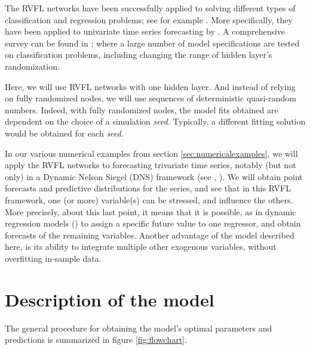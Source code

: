 \medskip

The RVFL networks have been successfully applied to solving different types of classification and regression problems; see for example \cite{dehuri2010comprehensive}. More specifically, they have been applied to univariate time series forecasting by \cite{ren2016random}. A comprehensive survey can be found in \cite{zhang2016comprehensive}; where a large number of model specifications are tested on classification problems, including changing the range of hidden layer's randomization.

\medskip

Here, we will use RVFL networks with one hidden layer. And instead of relying on fully randomized nodes, we will use sequences of deterministic quasi-random numbers. Indeed, with fully randomized nodes, the model fits obtained are dependent on the choice of a simulation \textit{seed}. Typically, a different fitting solution would be obtained for each \textit{seed}.

\medskip

In our various numerical examples from section \ref{sec:numericalexamples}, we will apply the RVFL networks to forecasting trivariate time series, notably (but not only) in a Dynamic Nelson Siegel (DNS) framework (see \cite{nelson1987parsimonious}, \cite{diebold2006forecasting}). We will obtain point forecasts and predictive distributions  for the series, and see that in this RVFL framework, one (or more) variable(s) can be stressed, and influence the others. More precisely, about this last point, it means that it is possible, as in dynamic regression models (\cite{pankratz2012forecasting}) to assign a specific future value to one regressor, and obtain forecasts of the remaining variables. Another advantage of the model described here, is its ability to integrate multiple other exogenous variables, without overfitting in-sample data.

\section{Description of the model}

The general procedure for obtaining the model's optimal parameters and predictions is  summarized in figure \ref{fig:flowchart}. 

